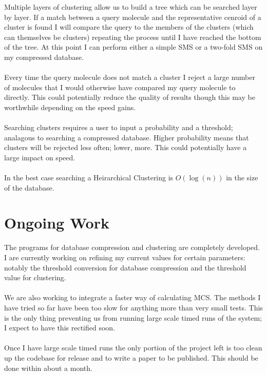 \documentclass[DIV=calc, paper=a4, fontsize=12pt, twocolumn]{scrartcl}	 %
\begin{document}
Multiple layers of clustering allow us to build a tree which can be searched layer by layer. If a match between a query molecule and the representative cenroid of a cluster is found I will compare the query to the members of the clusters (which can themselves be clusters) repeating the process until I have reached the bottom of the tree. At this point I can perform either a simple SMS or a two-fold SMS on my compressed database. 
\\\\
Every time the query molecule does not match a cluster I reject a large number of molecules that I would otherwise have compared my query molecule to directly. This could potentially reduce the quality of results though this may be worthwhile depending on the speed gains.
\\\\
Searching clusters requires a user to input a probability and a threshold; analagous to searching a compressed database. Higher probability means that clusters will be rejected less often; lower, more. This could potentially have a large impact on speed. 
\\\\
In the best case searching a Heirarchical Clustering is $O(\log(n))$ in the size of the database.

\section*{Ongoing Work}
The programs for database compression and clustering are completely developed. I are currently working on refining my current values for certain parameters: notably the threshold conversion for database compression and the threshold value for clustering. 
\\\\
We are also working to integrate a faster way of calculating MCS. The methods I have tried so far have been too slow for anything more than very small tests. This is the only thing preventing us from running large scale timed runs of the system; I expect to have this rectified soon.
\\\\
Once I have large scale timed runs the only portion of the project left is too clean up the codebase for release and to write a paper to be published. This should be done within about a month.


\end{document}
